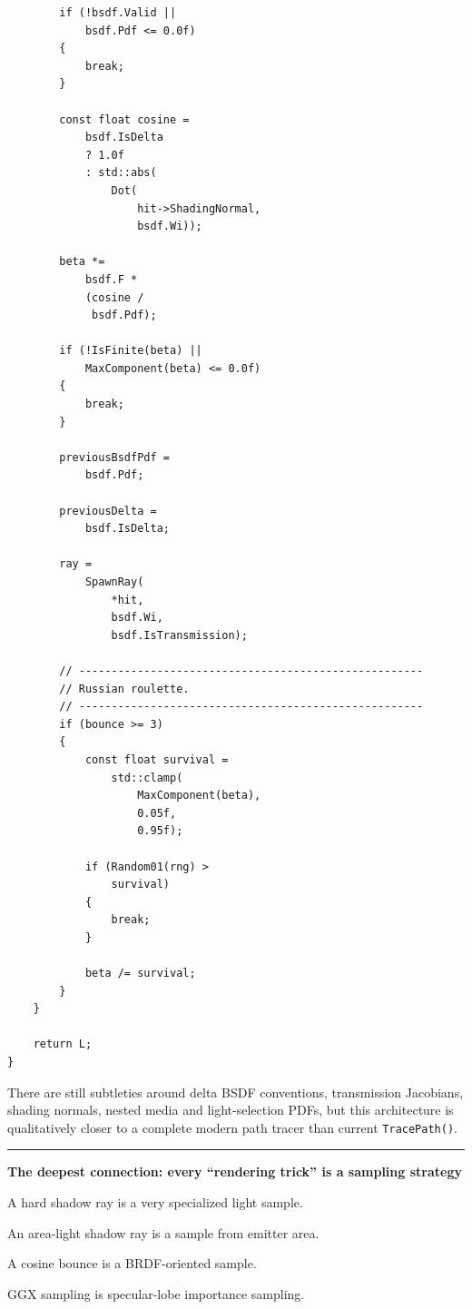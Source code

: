 \begin{verbatim}
        if (!bsdf.Valid ||
            bsdf.Pdf <= 0.0f)
        {
            break;
        }

        const float cosine =
            bsdf.IsDelta
            ? 1.0f
            : std::abs(
                Dot(
                    hit->ShadingNormal,
                    bsdf.Wi));

        beta *=
            bsdf.F *
            (cosine /
             bsdf.Pdf);

        if (!IsFinite(beta) ||
            MaxComponent(beta) <= 0.0f)
        {
            break;
        }

        previousBsdfPdf =
            bsdf.Pdf;

        previousDelta =
            bsdf.IsDelta;

        ray =
            SpawnRay(
                *hit,
                bsdf.Wi,
                bsdf.IsTransmission);

        // -----------------------------------------------------
        // Russian roulette.
        // -----------------------------------------------------
        if (bounce >= 3)
        {
            const float survival =
                std::clamp(
                    MaxComponent(beta),
                    0.05f,
                    0.95f);

            if (Random01(rng) >
                survival)
            {
                break;
            }

            beta /= survival;
        }
    }

    return L;
}
\end{verbatim}

There are still subtleties around delta BSDF conventions, transmission Jacobians, shading normals, nested media and light-selection PDFs, but this architecture is qualitatively closer to a complete modern path tracer than current \texttt{TracePath()}.

\begin{center}\rule{0.5\linewidth}{0.5pt}\end{center}

\textbf{The deepest connection: every ``rendering trick'' is a sampling strategy}

A hard shadow ray is a very specialized light sample.

An area-light shadow ray is a sample from emitter area.

A cosine bounce is a BRDF-oriented sample.

GGX sampling is specular-lobe importance sampling.

